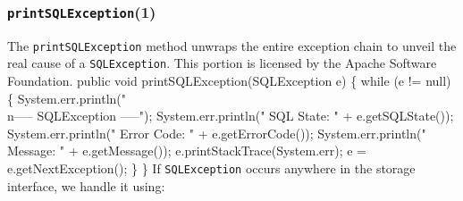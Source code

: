 \documentclass{article}
\def\nwendcode{\endtrivlist \endgroup}      %
\theoremstyle{definition}                   %
\begin{document}
\subsubsection{{\tt{}\protect{}printSQLException}(1)}
\label{sec:printSQLException(1)}
The {\tt{}\protect{}printSQLException} method  unwraps the entire exception chain to unveil
the real cause of a {\tt{}SQLException}.  This portion is licensed by the Apache
Software Foundation.
\nwenddocs{}\endmoddef{}
public void printSQLException(SQLException e) \{
  while (e != null) \{
    System.err.println("\\n----- SQLException -----");
    System.err.println("  SQL State:  " + e.getSQLState());
    System.err.println("  Error Code: " + e.getErrorCode());
    System.err.println("  Message:    " + e.getMessage());
    e.printStackTrace(System.err);
    e = e.getNextException();
  \}
\}
\eatline
{}\nwendcode{}If {\tt{}SQLException} occurs anywhere in the storage interface, we handle it using:
\end{document}
